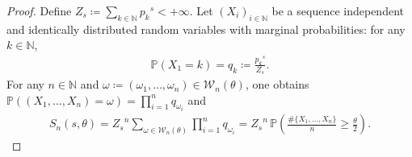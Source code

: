 \documentclass[10pt,a4paper]{amsart}
\begin{document}
\begin{proof}
Define $Z_s\coloneqq \sum_{k\in\mathbb{N}} {p_k}^{s}<+\infty$. Let $(X_i)_{i\in\mathbb{{N}}}$ be a sequence independent and identically distributed random variables with marginal probabilities: for any $k\in\mathbb{N}$, 
\begin{align*}
    \mathbb{P}(X_1=k)=q_k\coloneqq \frac{{p_k}^{s}}{Z_s}.
\end{align*}
For any $n\in\mathbb{N}$ and $\omega\coloneqq(\omega_1,\ldots,\omega_n)\in\mathcal{W}_n(\theta)$, one obtains $\mathbb P((X_1,\ldots,X_n)=\omega)=\prod_{i=1}^n q_{\omega_i}$ and
\begin{align}
\label{eq:tilt}
    S_n(s,\theta)
    ={Z_s}^n\sum_{\omega\in\mathcal{W}_n(\theta)}\prod_{i=1}^nq_{\omega_i}
    ={Z_s}^n\,\mathbb{P}\left(\frac{\#\{X_1,\ldots,X_n\}}{n}\geq \frac{\theta}{2}\right).
\end{align}


\end{proof}
\end{document}
